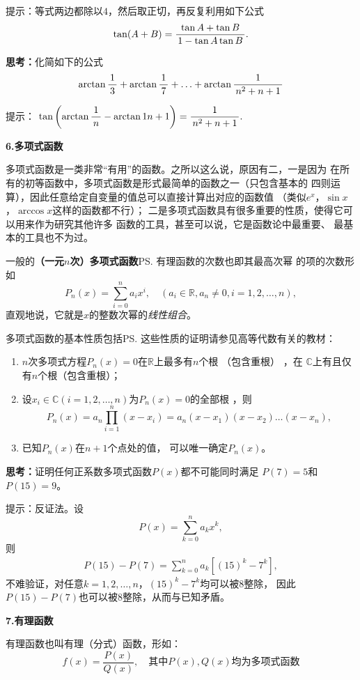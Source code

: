 \ifhint
提示：等式两边都除以$4$，然后取正切，再反复利用如下公式
$$\tan(A+B)=\displaystyle\frac{\,{\tan A+\tan B}\,}{\,{1-\tan A\tan B}\,}.$$
\fi

\bs
{\bf 思考：}化简如下的公式
$$\arctan\displaystyle\frac{\,{1}\,}{\,{3}\,}+\arctan\displaystyle\frac{\,{1}\,}{\,{7}\,}+\ldots+\arctan\displaystyle\frac{\,{1}\,}{\,{n^2+n+1}\,}$$

\ifhint
提示：
$\tan\left(\arctan\displaystyle\frac{\,{1}\,}{\,{n}\,}-\arctan1{n+1}\right)=\displaystyle\frac{\,{1}\,}{\,{n^2+n+1}\,}.$
\fi

\bs

{\bf 6.多项式函数}

多项式函数是一类非常“有用”的函数。之所以这么说，原因有二，一是因为
在所有的初等函数中，多项式函数是形式最简单的函数之一（只包含基本的
四则运算），因此任意给定自变量的值总可以直接计算出对应的函数值
（类似$e^x$，$\sin x$，$\arccos x$这样的函数都不行）；
二是多项式函数具有很多重要的性质，使得它可以用来作为研究其他许多
函数的工具，甚至可以说，它是函数论中最重要、
最基本的工具也不为过。

一般的{\bf （一元$n$次）多项式函数}\ps{有理函数的次数也即其最高次幂
的项的次数}形如
$$P_n(x)=\sum_{i=0}^na_ix^i,
\quad (a_i\in\mathbb{R},a_n\ne 0,i=1,2,\ldots,n),$$
直观地说，它就是$x$的整数次幂的{\it 线性组合}。

多项式函数的基本性质包括\ps{这些性质的证明请参见高等代数有关的教材}：
  \begin{enumerate}[(1)]
    \setlength{\itemindent}{1cm}
    \item { $n$次多项式方程$P_n(x)=0$在$\mathbb{R}$上最多有$n$个根 （包含重根） ，在
    $\mathbb{C}$上有且仅有$n$个根（包含重根）}；
    \item 设$x_i\in\mathbb{C}(i=1,2,\ldots,n)$为$P_n(x)=0$的全部根 ，则
    $$P_n(x)=a_n\prod_{i=1}^n(x-x_i)=a_n(x-x_1)(x-x_2)\ldots(x-x_n),$$
    \item 已知$P_n(x)$在$n+1$个点处的值， 可以唯一确定$P_n(x)$。
  \end{enumerate}

\bs
{\bf 思考：}证明任何正系数多项式函数$P(x)$都不可能同时满足
$P(7)=5$和$P(15)=9$。

\ifhint
提示：反证法。设
$$P(x)=\sum\limits_{k=0}^na_kx^k,$$
则
\begin{align*}
	P(15)-P(7)=\sum\limits_{k=0}^na_k\left[(15)^k-7^k\right],
\end{align*}
不难验证，对任意$k=1,2,\ldots,n$，$(15)^k-7^k$均可以被$8$整除，
因此$P(15)-P(7)$也可以被$8$整除，从而与已知矛盾。
\fi

\bs

{\bf 7.有理函数}

有理函数也叫有理（分式）函数，形如：
$$f(x)=\frac{P(x)}{Q(x)}, \quad\mbox{其中}P(x),Q(x)\mbox{均为多项式函数}$$

